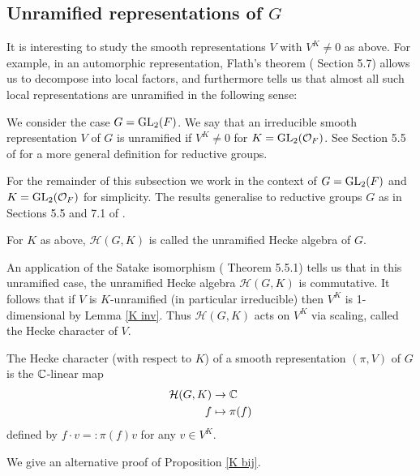 \subsection{Unramified representations of $G$}


It is interesting to study the smooth representations $V$ with $V^K \neq 0$ as above. For example, in an automorphic representation, Flath's theorem (\cite{GH1} Section 5.7) allows us to decompose into local factors, and furthermore tells us that almost all such local representations are unramified in the following sense:

\begin{defn}
    We consider the case $G=\mathrm{GL}_2(F)$. We say that an irreducible smooth representation $V$ of $G$ is unramified if $V^K \neq 0$ for $K= \mathrm{GL}_2(\mathcal{O}_F)$. See Section 5.5 of \cite{GH1} for a more general definition for reductive groups.
\end{defn}

For the remainder of this subsection we work in the context of $G=\mathrm{GL}_2(F)$ and $K = \mathrm{GL}_2(\mathcal{O}_F)$ for simplicity. The results generalise to reductive groups $G$ as in Sections 5.5 and 7.1 of \cite{GH1}.
\begin{defn}
    For $K$ as above, $\mathcal H(G,K)$ is called the unramified Hecke algebra of $G$.
\end{defn}

An application of the Satake isomorphism (\cite{GH1} Theorem 5.5.1) tells us that in this unramified case, the unramified Hecke algebra $\mathcal H(G,K)$ is commutative. It follows that if $V$ is $K$-unramified (in particular irreducible) then $V^K$ is 1-dimensional by Lemma \ref{K inv}. Thus $\mathcal H(G,K)$ acts on $V^K$ via scaling, called the Hecke character of $V$.

\begin{defn}
    The Hecke character (with respect to $K$) of a smooth representation $(\pi,V)$ of $G$ is the $\mathbb{C}$-linear map
    \begin{equation*}
        \begin{split}
            \mathcal H(G,K) &\to \mathbb{C} \\
            f &\mapsto \pi(f)
        \end{split}
    \end{equation*}
    defined by $f \cdot v =: \pi(f) v $ for any $v \in V^K$.
\end{defn}

We give an alternative proof of Proposition \ref{K bij}.

